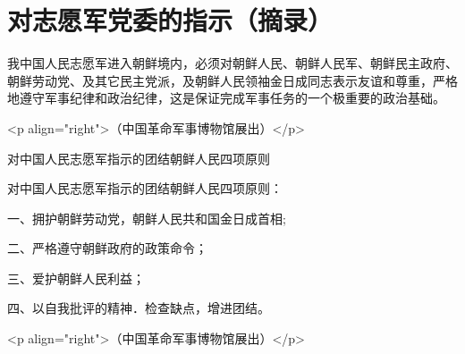 \section[对志愿军党委的指示（摘录） ]{对志愿军党委的指示（摘录） }


我中国人民志愿军进入朝鲜境内，必须对朝鲜人民、朝鲜人民军、朝鲜民主政府、朝鲜劳动党、及其它民主党派，及朝鲜人民领袖金日成同志表示友谊和尊重，严格地遵守军事纪律和政治纪律，这是保证完成军事任务的一个极重要的政治基础。

<p align="right">（中国革命军事博物馆展出）</p>

对中国人民志愿军指示的团结朝鲜人民四项原则

对中国人民志愿军指示的团结朝鲜人民四项原则：

一、拥护朝鲜劳动党，朝鲜人民共和国金日成首相;

二、严格遵守朝鲜政府的政策命令；

三、爱护朝鲜人民利益；

四、以自我批评的精神．检查缺点，增进团结。

<p align="right">（中国革命军事博物馆展出）</p>


